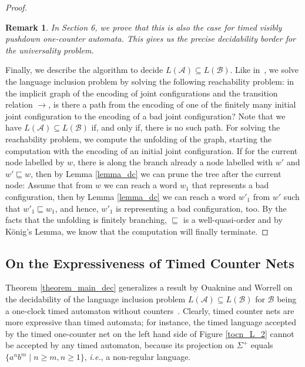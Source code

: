 \documentclass{CSML}
\theoremstyle{plain}\newtheorem{theorem}[thm]{Theorem}
\theoremstyle{plain}\newtheorem{corollary}[thm]{Corollary}
\theoremstyle{plain}\newtheorem{example}[thm]{Example}
\theoremstyle{plain}\newtheorem{lemma}[thm]{Lemma}
\theoremstyle{plain}\newtheorem{remark}[thm]{Remark}
\newcommand{\B}{\mathcal{B}}
\newcommand*\ie{\textit{i.e.}}
\newcommand{\A}{\mathcal{A}}
\begin{document}
\begin{proof}
\begin{remark}
		In Section 6, we prove that this is also the case for timed visibly pushdown one-counter automata. 
		This gives us the precise decidability border for the universality problem. 
	\end{remark}
Finally, we describe the algorithm to decide $L(\A)\subseteq L(\B)$. 
		Like in~\cite{DBLP:conf/lics/OuaknineW04}, 
		we solve the language inclusion problem by solving the following reachability problem: in the implicit graph of the encoding of joint configurations and the transition relation $\to$,
		is there a path from the encoding of one of the finitely many  initial joint configuration to the encoding of a bad joint configuration?
		Note that we have $L(\A)\subseteq L(\B)$ if, and only if, there is no such path. 
		For solving the reachability problem, we compute the unfolding of the graph, 
		starting the computation with the encoding of an initial joint configuration.
		If for the current node labelled by $w$, there is along the branch already a node labelled with $w'$ and $w'\sqsubseteq w$, 
		then by Lemma \ref{lemma_dc} we can prune the tree after the current node: 
		Assume that from $w$ we can reach a word $w_1$ that represents a bad configuration,
		then by Lemma \ref{lemma_dc} we can reach a word $w'_1$ from $w'$ such that $w'_1\sqsubseteq w_1$, and hence, $w'_1$ is representing a bad configuration, too. 		
		By the facts that the unfolding is finitely branching, $\sqsubseteq$ is a well-quasi-order and by K\"onig's Lemma, we know that the computation will finally terminate. 
	\end{proof}
	
	
	\subsection{On the Expressiveness of Timed Counter Nets}
	Theorem \ref{theorem_main_dec} generalizes a result by Ouaknine and Worrell on the decidability of the language inclusion problem $L(\A)\subseteq L(\B)$ for $\B$ being a one-clock timed automaton without counters~\cite{DBLP:conf/lics/OuaknineW04}.
	Clearly, timed counter nets are more expressive than timed automata; for instance, the timed language accepted by the timed one-counter net on the left hand side of Figure \ref{tocn_L_2} cannot be accepted by any timed automaton, because its projection on $\Sigma^+$ equals $\{a^nb^m\mid n\geq m, n\geq 1\}$, \ie, a non-regular language. 
		
\end{document}
